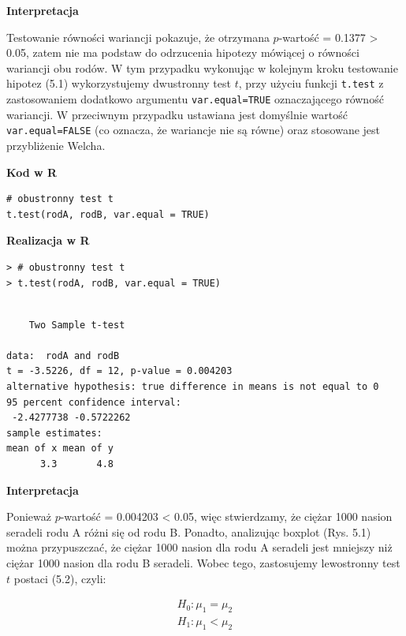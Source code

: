 \documentclass[12pt,B5paper,]{book}
\begin{document}
\vspace{0.8cm} \textbf{Interpretacja}

Testowanie równości wariancji pokazuje, że otrzymana \(p\)-wartość =
0.1377 \textgreater{} 0.05, zatem nie ma podstaw do odrzucenia hipotezy
mówiącej o równości wariancji obu rodów. W tym przypadku wykonując w
kolejnym kroku testowanie hipotez (5.1) wykorzystujemy dwustronny test
\(t\), przy użyciu funkcji \texttt{t.test} z zastosowaniem dodatkowo
argumentu \texttt{var.equal=TRUE} oznaczającego równość wariancji. W
przeciwnym przypadku ustawiana jest domyślnie wartość
\texttt{var.equal=FALSE} (co oznacza, że wariancje nie są równe) oraz
stosowane jest przybliżenie Welcha.

\vspace{0.8cm} \textbf{Kod w R}

\begin{verbatim}
# obustronny test t
t.test(rodA, rodB, var.equal = TRUE)
\end{verbatim}

\vspace{0.8cm} \textbf{Realizacja w R}

\begin{verbatim}
> # obustronny test t
> t.test(rodA, rodB, var.equal = TRUE)
\end{verbatim}

\begin{verbatim}

    Two Sample t-test

data:  rodA and rodB
t = -3.5226, df = 12, p-value = 0.004203
alternative hypothesis: true difference in means is not equal to 0
95 percent confidence interval:
 -2.4277738 -0.5722262
sample estimates:
mean of x mean of y 
      3.3       4.8 
\end{verbatim}

\vspace{0.8cm} \textbf{Interpretacja}

Ponieważ \(p\)-wartość = 0.004203 \textless{} 0.05, więc stwierdzamy, że
ciężar 1000 nasion seradeli rodu A różni się od rodu B. Ponadto,
analizując boxplot (Rys. 5.1) można przypuszczać, że ciężar 1000 nasion
dla rodu A seradeli jest mniejszy niż ciężar 1000 nasion dla rodu B
seradeli. Wobec tego, zastosujemy lewostronny test \(t\) postaci (5.2),
czyli: \vspace{-0.6cm}

\begin{align*}
        H_0: \mu_1 = \mu_2 \\
        H_1: \mu_1 < \mu_2
\end{align*}
\end{document}
